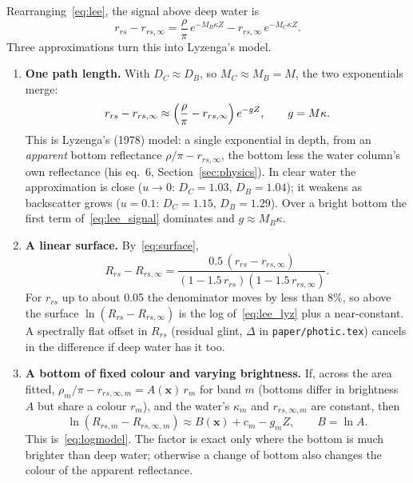 \documentclass[11pt]{article}
\numberwithin{equation}{section}
\newcommand{\bx}{\mathbf{x}}
\newcommand{\code}[1]{\texttt{#1}}
\begin{document}
Rearranging~\eqref{eq:lee}, the signal above deep water is
\begin{equation}
  r_{rs} - r_{rs,\infty} = \frac{\rho}{\pi}\, e^{-M_B \kappa Z} - r_{rs,\infty}\, e^{-M_C \kappa Z} .
  \label{eq:lee_signal}
\end{equation}
Three approximations turn this into Lyzenga's model.
\begin{enumerate}
\item \textbf{One path length.} With $D_C \approx D_B$, so $M_C \approx M_B = M$, the two
  exponentials merge:
  \begin{equation}
    r_{rs} - r_{rs,\infty} \approx \Bigl(\frac{\rho}{\pi} - r_{rs,\infty}\Bigr)\, e^{-g Z},
    \qquad g = M\kappa .
    \label{eq:lee_lyz}
  \end{equation}
  This is Lyzenga's (1978) model: a single exponential in depth, from an \emph{apparent} bottom
  reflectance $\rho/\pi - r_{rs,\infty}$, the bottom less the water column's own reflectance
  (his eq.~6, Section~\ref{sec:physics}). In clear water the approximation is close
  ($u \to 0$: $D_C = 1.03$, $D_B = 1.04$); it weakens as backscatter grows ($u = 0.1$: $D_C = 1.15$,
  $D_B = 1.29$). Over a bright bottom the first term of~\eqref{eq:lee_signal} dominates and
  $g \approx M_B\kappa$.
\item \textbf{A linear surface.} By~\eqref{eq:surface},
  \begin{equation*}
    R_{rs} - R_{rs,\infty} = \frac{0.5\,(r_{rs} - r_{rs,\infty})}
      {(1 - 1.5\,r_{rs})(1 - 1.5\,r_{rs,\infty})} .
  \end{equation*}
  For $r_{rs}$ up to about 0.05 the denominator moves by less than 8\%, so above the surface
  $\ln(R_{rs} - R_{rs,\infty})$ is the log of~\eqref{eq:lee_lyz} plus a near-constant. A
  spectrally flat offset in $R_{rs}$ (residual glint, $\Delta$ in \code{paper/photic.tex}) cancels in
  the difference if deep water has it too.
\item \textbf{A bottom of fixed colour and varying brightness.} If, across the area fitted,
  $\rho_m/\pi - r_{rs,\infty,m} = A(\bx)\, r_m$ for band $m$ (bottoms differ in brightness $A$ but
  share a colour $r_m$), and the water's $\kappa_m$ and $r_{rs,\infty,m}$ are constant, then
  \begin{equation}
    \ln(R_{rs,m} - R_{rs,\infty,m}) \approx B(\bx) + c_m - g_m Z ,
    \qquad B = \ln A .
  \end{equation}
  This is~\eqref{eq:logmodel}. The factor is exact only where the bottom is much brighter than deep
  water; otherwise a change of bottom also changes the colour of the apparent reflectance.
\end{enumerate}
\end{document}

